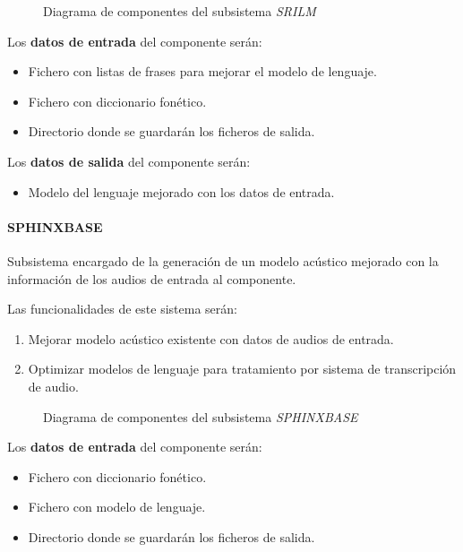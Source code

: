 \documentclass[../main.tex]{subfiles}
\begin{document}
\begin{figure}[H]
    \centering
    
    \label{fig:components_srilm}
    \caption{Diagrama de componentes del subsistema \textit{SRILM}}
\end{figure}

Los \textbf{datos de entrada} del componente serán:
\begin{itemize}
    \item Fichero con listas de frases para mejorar el modelo de lenguaje.
    \item Fichero con diccionario fonético.
    \item Directorio donde se guardarán los ficheros de salida.
\end{itemize}

Los \textbf{datos de salida} del componente serán:
\begin{itemize}
    \item Modelo del lenguaje mejorado con los datos de entrada.
\end{itemize}

\paragraph{SPHINXBASE}\label{par:sphinxbase}
Subsistema encargado de la generación de un modelo acústico mejorado con la información de los audios de entrada al componente.

Las funcionalidades de este sistema serán:
\begin{enumerate}
    \item Mejorar modelo acústico existente con datos de audios de entrada.
    \item Optimizar modelos de lenguaje para tratamiento por sistema de transcripción de audio.
\end{enumerate}

\begin{figure}[H]
    \centering
    
    \label{fig:components_sphinxbase}
    \caption{Diagrama de componentes del subsistema \textit{SPHINXBASE}}
\end{figure}

Los \textbf{datos de entrada} del componente serán:
\begin{itemize}
    \item Fichero con diccionario fonético.
    \item Fichero con modelo de lenguaje.
    \item Directorio donde se guardarán los ficheros de salida.
\end{itemize}
\end{document}
